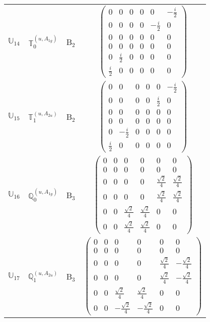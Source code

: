 \documentclass[fleqn,10pt,landscape]{article}
\begin{document}
\begin{itemize}
\begin{center}
\begin{longtable}{c|c|c|c}
$ \mathbb{U}_{14} $ & $\mathbb{T}_{0}^{(u,A_{1g})}$ & B$_{2}$ & $\begin{pmatrix} 0 & 0 & 0 & 0 & 0 & - \frac{i}{2} \\ 0 & 0 & 0 & 0 & - \frac{i}{2} & 0 \\ 0 & 0 & 0 & 0 & 0 & 0 \\ 0 & 0 & 0 & 0 & 0 & 0 \\ 0 & \frac{i}{2} & 0 & 0 & 0 & 0 \\ \frac{i}{2} & 0 & 0 & 0 & 0 & 0 \end{pmatrix}$ \\
$ \mathbb{U}_{15} $ & $\mathbb{T}_{1}^{(u,A_{2u})}$ & B$_{2}$ & $\begin{pmatrix} 0 & 0 & 0 & 0 & 0 & - \frac{i}{2} \\ 0 & 0 & 0 & 0 & \frac{i}{2} & 0 \\ 0 & 0 & 0 & 0 & 0 & 0 \\ 0 & 0 & 0 & 0 & 0 & 0 \\ 0 & - \frac{i}{2} & 0 & 0 & 0 & 0 \\ \frac{i}{2} & 0 & 0 & 0 & 0 & 0 \end{pmatrix}$ \\ \hline
$ \mathbb{U}_{16} $ & $\mathbb{Q}_{0}^{(u,A_{1g})}$ & B$_{3}$ & $\begin{pmatrix} 0 & 0 & 0 & 0 & 0 & 0 \\ 0 & 0 & 0 & 0 & 0 & 0 \\ 0 & 0 & 0 & 0 & \frac{\sqrt{2}}{4} & \frac{\sqrt{2}}{4} \\ 0 & 0 & 0 & 0 & \frac{\sqrt{2}}{4} & \frac{\sqrt{2}}{4} \\ 0 & 0 & \frac{\sqrt{2}}{4} & \frac{\sqrt{2}}{4} & 0 & 0 \\ 0 & 0 & \frac{\sqrt{2}}{4} & \frac{\sqrt{2}}{4} & 0 & 0 \end{pmatrix}$ \\
$ \mathbb{U}_{17} $ & $\mathbb{Q}_{1}^{(u,A_{2u})}$ & B$_{3}$ & $\begin{pmatrix} 0 & 0 & 0 & 0 & 0 & 0 \\ 0 & 0 & 0 & 0 & 0 & 0 \\ 0 & 0 & 0 & 0 & \frac{\sqrt{2}}{4} & - \frac{\sqrt{2}}{4} \\ 0 & 0 & 0 & 0 & \frac{\sqrt{2}}{4} & - \frac{\sqrt{2}}{4} \\ 0 & 0 & \frac{\sqrt{2}}{4} & \frac{\sqrt{2}}{4} & 0 & 0 \\ 0 & 0 & - \frac{\sqrt{2}}{4} & - \frac{\sqrt{2}}{4} & 0 & 0 \end{pmatrix}$ \\

\end{longtable}
\end{center}
\end{itemize}
\end{document}
